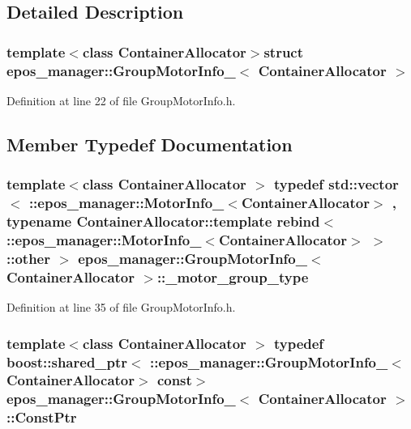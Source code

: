 \subsection{\-Detailed \-Description}
\subsubsection*{template$<$class Container\-Allocator$>$struct epos\-\_\-manager\-::\-Group\-Motor\-Info\-\_\-$<$ Container\-Allocator $>$}



\-Definition at line 22 of file \-Group\-Motor\-Info.\-h.



\subsection{\-Member \-Typedef \-Documentation}
\subsubsection[{\-\_\-motor\-\_\-group\-\_\-type}]{\setlength{\rightskip}{0pt plus 5cm}template$<$class Container\-Allocator $>$ typedef std\-::vector$<$ \-::{\bf epos\-\_\-manager\-::\-Motor\-Info\-\_\-}$<$\-Container\-Allocator$>$ , typename \-Container\-Allocator\-::template rebind$<$ \-::{\bf epos\-\_\-manager\-::\-Motor\-Info\-\_\-}$<$\-Container\-Allocator$>$ $>$\-::other $>$ {\bf epos\-\_\-manager\-::\-Group\-Motor\-Info\-\_\-}$<$ \-Container\-Allocator $>$\-::{\bf \-\_\-motor\-\_\-group\-\_\-type}}\label{structepos__manager_1_1GroupMotorInfo___a7f9b95a55fd1b369a84af0e5c7d22197}


\-Definition at line 35 of file \-Group\-Motor\-Info.\-h.

\subsubsection[{\-Const\-Ptr}]{\setlength{\rightskip}{0pt plus 5cm}template$<$class Container\-Allocator $>$ typedef boost\-::shared\-\_\-ptr$<$ \-::{\bf epos\-\_\-manager\-::\-Group\-Motor\-Info\-\_\-}$<$\-Container\-Allocator$>$ const$>$ {\bf epos\-\_\-manager\-::\-Group\-Motor\-Info\-\_\-}$<$ \-Container\-Allocator $>$\-::{\bf \-Const\-Ptr}}\label{structepos__manager_1_1GroupMotorInfo___af228c4829509e0ef92be053ae9122f5b}


